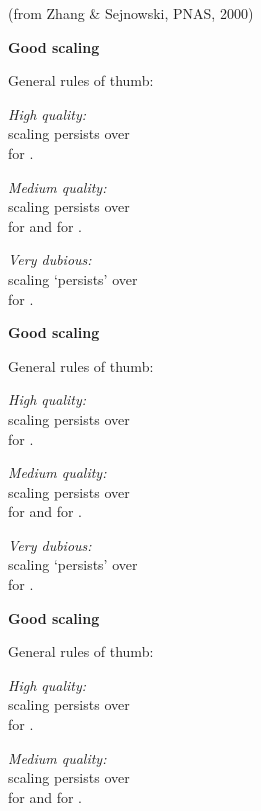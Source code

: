 \hfill{\tiny(from Zhang \& Sejnowski, PNAS, 2000)}


  \textbf{Good scaling}

General rules of thumb:

\textit{High quality:}\\ scaling persists 
over \\
for .

\inv

\textit{Medium quality:}\\ scaling persists
over \\
for  and 
 for .

\textit{Very dubious:}\\ scaling `persists'
over \\
for .


  \textbf{Good scaling}

General rules of thumb:

\textit{High quality:}\\ scaling persists 
over \\
for .

\textit{Medium quality:}\\ scaling persists
over \\
for  and 
 for .

\inv

\textit{Very dubious:}\\ scaling `persists'
over \\
for .



  \textbf{Good scaling}

General rules of thumb:

\textit{High quality:}\\ scaling persists 
over \\
for .

\textit{Medium quality:}\\ scaling persists
over \\
for  and 
 for .

